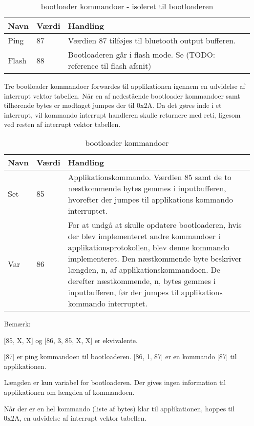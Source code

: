 \begin{table}[H]
	\caption{bootloader kommandoer - isoleret til bootloaderen}
	\label{tab:blcommand}
	\centering

	\begin{tabular}{|l|l|p{13cm}|}
		\hline
		\textbf{Navn} & \textbf{Værdi} & \textbf{Handling} \\
		\hline
		Ping & 87 & Værdien 87 tilføjes til bluetooth output bufferen.\\
		\hline
		Flash & 88 & Bootloaderen går i flash mode. Se (TODO: reference til flash afsnit)
		\hline
	\end{tabular}
\end{table}

Tre bootloader kommandoer forwardes til applikationen igennem en udvidelse af interrupt vektor tabellen.
Når en af nedestående bootloader kommandoer samt tilhørende bytes er modtaget jumpes der til 0x2A. Da det gøres inde i et interrupt, vil kommando interrupt handleren skulle returnere med reti, ligesom ved resten af interrupt vektor tabellen.

\begin{table}[H]
	\caption{bootloader kommandoer}
	\label{tab:blcommand}
	\centering

	\begin{tabular}{|l|l|p{13cm}|}
		\hline
		\textbf{Navn} & \textbf{Værdi} & \textbf{Handling} \\
		\hline
		Set & 85 & Applikationskommando. Værdien 85 samt de to næstkommende bytes gemmes i inputbufferen, hvorefter der jumpes til applikations kommando interruptet.\\
		\hline
		Var & 86 & For at undgå at skulle opdatere bootloaderen, hvis der blev implementeret andre kommandoer i applikationsprotokollen, blev denne kommando implementeret. Den næstkommende byte beskriver længden, n, af applikationskommandoen. De derefter næstkommende, n, bytes gemmes i inputbufferen, før der jumpes til applikations kommando interruptet.\\
		\hline
	\end{tabular}
\end{table}


\begin{mdquote}
	Bemærk:

	[85, X, X] og [86, 3, 85, X, X] er ekvivalente.

	[87] er ping kommandoen til bootloaderen. [86, 1, 87] er en kommando [87] til applikationen.
\end{mdquote}



Længden er kun variabel for bootloaderen. Der gives ingen information til applikationen om længden af kommandoen.

Når der er en hel kommando (liste af bytes) klar til applikationen, hoppes til 0x2A, en udvidelse af interrupt vektor tabellen.
